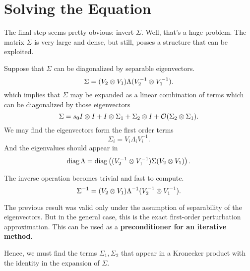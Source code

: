 \section{Solving the Equation}

\begin{frame}{The final step seems pretty obvious: invert $\Sigma$.}
Well, that's a huge problem. The matrix $\Sigma$ is very large and dense, but still, posses a structure that can be exploited.

\end{frame}

\begin{frame}{Suppose that $\Sigma$ can be diagonalized by separable eigenvectors.}
\begin{equation*}
\Sigma = (V_2 \otimes V_1) \Lambda (V_2^{-1} \otimes V_1^{-1}).
\end{equation*}
which implies that $\Sigma$ may be expanded as a linear combination of terms which can be diagonalized by those eigenvectors
\begin{equation*}
\Sigma = s_0 I\otimes I + I\otimes \Sigma_1 + \Sigma_2 \otimes I + \mathcal{O}(\Sigma_2\otimes \Sigma_1).
\end{equation*}
We may find the eigenvectors form the first order terms
\begin{equation*}
\Sigma_i=V_i \Lambda_i V_i^{-1}.
\end{equation*}
And the eigenvalues should appear in
\begin{equation*}
\operatorname{diag}{\Lambda} = \operatorname{diag}\left((V_2^{-1} \otimes V_1^{-1}) \Sigma (V_2 \otimes V_1)\right).
\end{equation*}
\end{frame}

\begin{frame}{The inverse operation becomes trivial and fast to compute.}
\begin{equation*}
\Sigma^{-1} = (V_2 \otimes V_1) \Lambda^{-1} (V_2^{-1} \otimes V_1^{-1}).
\end{equation*}

The previous result was valid only under the assumption of separability of the eigenvectors. But in the general case, this is the exact first-order perturbation approximation. This can be used as a \textbf{preconditioner for an iterative method}.

\bigskip
Hence, we must find the terms $\Sigma_1, \Sigma_2$ that appear in a Kronecker product with the identity in the expansion of $\Sigma$. 
\end{frame}
